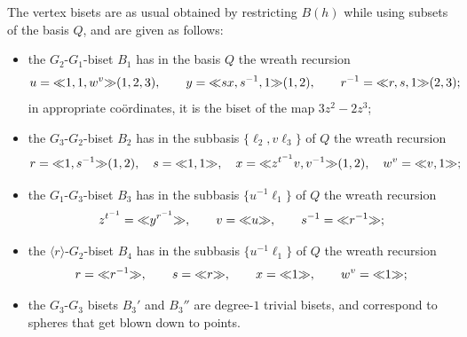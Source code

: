 \documentclass{amsart}
\begin{document}
The vertex bisets are as usual obtained by restricting $B(h)$ while using
subsets of the basis $Q$, and are given as follows:
\begin{itemize}
\item the $G_2$-$G_1$-biset $B_1$ has in the basis $Q$
  the wreath recursion
  \[u={\ll}1,1,w^v{\gg}(1,2,3), \qquad y={\ll}s x,s^{-1},1{\gg}(1,2),\qquad
  r^{-1}={\ll}r,s,1{\gg}(2,3);\]
  in appropriate co\"ordinates, it is the biset of the map
  $3z^2-2z^3$;
\item the $G_3$-$G_2$-biset $B_2$ has in the subbasis
  $\{\ell_2,v\ell_3\}$ of $Q$ the wreath recursion
  \[r={\ll}1,s^{-1}{\gg}(1,2),\quad s={\ll}1,1{\gg},\quad x={\ll}z^{t^{-1}}v,v^{-1}{\gg}(1,2),\quad w^v={\ll}v,1{\gg};\]
\item the $G_1$-$G_3$-biset $B_3$ has in the subbasis
  $\{u^{-1}\ell_1\}$ of $Q$ the wreath recursion
  \[z^{t^{-1}}={\ll}y^{r^{-1}}{\gg},\qquad v={\ll}u{\gg},\qquad s^{-1}={\ll}r^{-1}{\gg};\]
\item the $\langle r\rangle$-$G_2$-biset $B_4$ has in the subbasis
  $\{u^{-1}\ell_1\}$ of $Q$ the wreath recursion
  \[r={\ll}r^{-1}{\gg},\qquad s={\ll}r{\gg},\qquad x={\ll}1{\gg},\qquad w^v={\ll}1{\gg};\]
\item the $G_3$-$G_3$ bisets $B_3'$ and $B_3''$ are degree-$1$ trivial
  bisets, and correspond to spheres that get blown down to points.
\end{itemize}
\end{document}
